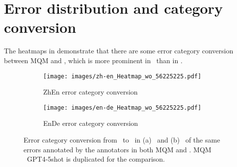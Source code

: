 \section{Error distribution and category conversion}\label{appendix:error_distribution}




The heatmaps in  demonstrate that there are some error category conversion between MQM and \sxsmqm, which is more prominent in \ZhEn~than in \EnDe. 

\begin{figure*}[ht]
    \centering
    \begin{subfigure}[b]{0.45\textwidth}
        \centering
        \texttt{[image: images/zh-en\_Heatmap\_wo\_56225225.pdf]}
        \caption{ZhEn error category conversion}
        \label{fig:ZhEn_heatmap}
    \end{subfigure}
    \hspace{0.05\textwidth}  %
    \begin{subfigure}[b]{0.46\textwidth}
        \centering
        \texttt{[image: images/en-de\_Heatmap\_wo\_56225225.pdf]}
        \caption{EnDe error category conversion}
        \label{fig:EnDe_heatmap}
    \end{subfigure}
    
    \caption{Error category conversion from \psxsmqm~to \sxsmqm~in (a) \ZhEn~and (b) \EnDe~of the same errors annotated by the annotators in both MQM and \sxsmqm. MQM \EnDe~GPT4-5shot is duplicated for the comparison.}
    \label{fig:category_conversion}
\end{figure*}
